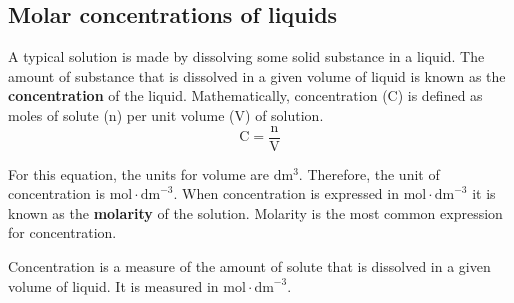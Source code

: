             \subsection*{Molar concentrations of liquids}
            \nopagebreak
      \label{m38712*id282848}A typical solution is made by dissolving some solid substance in a liquid. The amount of substance that is dissolved in a given volume of liquid is known as the \textbf{concentration} of the liquid. Mathematically, concentration (C) is defined as moles of solute (n) per unit volume (V) of solution.
      \label{m38712*id282860}\nopagebreak\noindent{}      
    \begin{equation*}
    \text{C}=\frac{\text{n}}{\text{V}}
      \end{equation*}
	\begin{figure}[H] %
\begin{center}
\end{center}
 \end{figure}
      \label{m38712*id282881}For this equation, the units for volume are $\text{dm}{}^{3}$. Therefore, the unit of concentration is $\text{mol}\ensuremath{\cdot}{\text{dm}}^{-3}$.
When concentration is expressed in $\text{mol}\ensuremath{\cdot}{\text{dm}}^{-3}$ it is known as the \textbf{molarity} of the solution. Molarity is the most common expression for concentration.
	\par
\label{m38712*fhsst!!!underscore!!!id1650}
 { \label{m38712*meaningfhsst!!!underscore!!!id1650}
      \label{m38712*id282955}Concentration is a measure of the amount of solute that is dissolved in a given volume of liquid. It is measured in $\text{mol}\ensuremath{\cdot}{\text{dm}}^{-3}$.} 
\par
            \label{m38712*secfhsst!!!underscore!!!id1653}\vspace{-2cm} 
      \noindent
